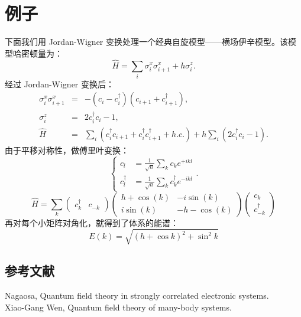 \documentclass[10pt,UTF8]{ctexart}
\begin{document}
\section*{例子}
\noindent 下面我们用 Jordan-Wigner 变换处理一个经典自旋模型——横场伊辛模型。该模型哈密顿量为：
\begin{equation}
	\hat{H}=\sum_{i}\sigma_{i}^{x}\sigma_{i+1}^{x}+h\sigma_{i}^{z} .
\end{equation}
经过 Jordan-Wigner 变换后：
\begin{eqnarray}
	\sigma_{i}^{x}\sigma_{i+1}^{x} &=& -\left(c_{i}-c_{i}^{\dagger}\right)\left(c_{i+1}+c_{i+1}^{\dagger}\right), \\
	\sigma_{i}^{z} &=& 2c_{i}^{\dagger}c_{i}-1, \\
	\hat{H} &=& \sum_{i}\left(c_{i}^{\dagger}c_{i+1}+c_{i}^{\dagger}c_{i+1}^{\dagger}+h.c.\right)+h\sum_{i}\left(2c_{i}^{\dagger}c_{i}-1\right).
\end{eqnarray}
由于平移对称性，做傅里叶变换：
\begin{equation}
	\begin{cases} c_{l} & =\frac{1}{\sqrt{n}}\sum_{k}c_{k}e^{+ikl}\\ c_{l}^{\dagger} & =\frac{1}{\sqrt{n}}\sum_{k}c_{k}^{\dagger}e^{-ikl} \end{cases}.
\end{equation}
\begin{equation}
	\hat{H}=\sum_{k}\left(\begin{array}{cc} c_{k}^{\dagger} & c_{-k}\end{array}\right)\left(\begin{array}{cc} h+\cos\left(k\right) & -i\sin\left(k\right)\\ i\sin\left(k\right) & -h-\cos\left(k\right) \end{array}\right)\left(\begin{array}{c} c_{k}\\ c_{-k}^{\dagger} \end{array}\right) 
\end{equation}
再对每个小矩阵对角化，就得到了体系的能谱：
\begin{equation}
	E\left(k\right)=\sqrt{\left(h+\cos k\right)^{2}+\sin^{2}k} 
\end{equation}


\subsection*{参考文献}
\noindent [1] Nagaosa, Quantum field theory in strongly correlated electronic systems. \\
\noindent [2] Xiao-Gang Wen,  Quantum field theory of many-body systems.
\end{document}
